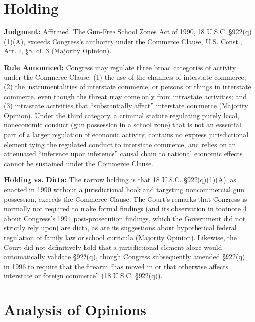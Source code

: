 \documentclass[12pt]{article}
\begin{document}
\section{Holding}
\textbf{Judgment:} Affirmed. The Gun-Free School Zones Act of 1990, 18 U.S.C. \S 922(q)(1)(A), exceeds Congress's authority under the Commerce Clause, U.S. Const., Art. I, \S 8, cl. 3 (\href{https://www.law.cornell.edu/supct/html/93-1260.ZO.html}{Majority Opinion}).

\textbf{Rule Announced:} Congress may regulate three broad categories of activity under the Commerce Clause: (1) the use of the channels of interstate commerce; (2) the instrumentalities of interstate commerce, or persons or things in interstate commerce, even though the threat may come only from intrastate activities; and (3) intrastate activities that ``substantially affect'' interstate commerce (\href{https://www.law.cornell.edu/supct/html/93-1260.ZO.html}{Majority Opinion}). Under the third category, a criminal statute regulating purely local, noneconomic conduct (gun possession in a school zone) that is not an essential part of a larger regulation of economic activity, contains no express jurisdictional element tying the regulated conduct to interstate commerce, and relies on an attenuated ``inference upon inference'' causal chain to national economic effects cannot be sustained under the Commerce Clause.

\textbf{Holding vs. Dicta:} The narrow holding is that 18 U.S.C. \S 922(q)(1)(A), as enacted in 1990 without a jurisdictional hook and targeting noncommercial gun possession, exceeds the Commerce Clause. The Court's remarks that Congress is normally not required to make formal findings (and its observation in footnote 4 about Congress's 1994 post-prosecution findings, which the Government did not strictly rely upon) are dicta, as are its suggestions about hypothetical federal regulation of family law or school curricula (\href{https://www.law.cornell.edu/supct/html/93-1260.ZO.html}{Majority Opinion}). Likewise, the Court did not definitively hold that a jurisdictional element alone would automatically validate \S 922(q), though Congress subsequently amended \S 922(q) in 1996 to require that the firearm ``has moved in or that otherwise affects interstate or foreign commerce'' (\href{https://www.govregs.com/uscode/expand/title18_partI_chapter44_section922}{18 U.S.C. \S 922(q)}).

\section{Analysis of Opinions}
\end{document}
